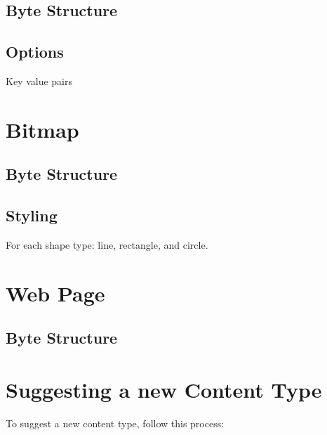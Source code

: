 \documentclass{report}
\begin{document}
\subsection{Byte Structure}
\subsection{Options}
Key value pairs
\section{Bitmap}
\subsection{Byte Structure}
\subsection{Styling}
For each shape type: line, rectangle, and circle.
\section{Web Page}
\subsection{Byte Structure}
\section{Suggesting a new Content Type}
To suggest a new content type, follow this process:
\end{document}

